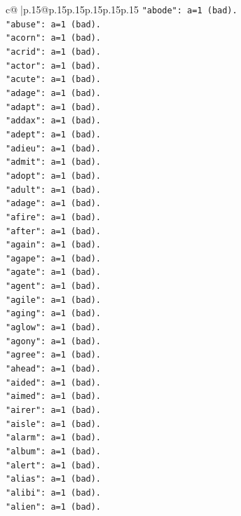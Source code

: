 \documentclass{article}
\begin{document}
{\begin{supertabular}{c@{$\;$}|p{.15\linewidth}@{}p{.15\linewidth}p{.15\linewidth}p{.15\linewidth}p{.15\linewidth}p{.15\linewidth}}
{{{\texttt{"abode": a=1 (bad).} \\
\texttt{"abuse": a=1 (bad).} \\
\texttt{"acorn": a=1 (bad).} \\
\texttt{"acrid": a=1 (bad).} \\
\texttt{"actor": a=1 (bad).} \\
\texttt{"acute": a=1 (bad).} \\
\texttt{"adage": a=1 (bad).} \\
\texttt{"adapt": a=1 (bad).} \\
\texttt{"addax": a=1 (bad).} \\
\texttt{"adept": a=1 (bad).} \\
\texttt{"adieu": a=1 (bad).} \\
\texttt{"admit": a=1 (bad).} \\
\texttt{"adopt": a=1 (bad).} \\
\texttt{"adult": a=1 (bad).} \\
\texttt{"adage": a=1 (bad).} \\
\texttt{"afire": a=1 (bad).} \\
\texttt{"after": a=1 (bad).} \\
\texttt{"again": a=1 (bad).} \\
\texttt{"agape": a=1 (bad).} \\
\texttt{"agate": a=1 (bad).} \\
\texttt{"agent": a=1 (bad).} \\
\texttt{"agile": a=1 (bad).} \\
\texttt{"aging": a=1 (bad).} \\
\texttt{"aglow": a=1 (bad).} \\
\texttt{"agony": a=1 (bad).} \\
\texttt{"agree": a=1 (bad).} \\
\texttt{"ahead": a=1 (bad).} \\
\texttt{"aided": a=1 (bad).} \\
\texttt{"aimed": a=1 (bad).} \\
\texttt{"airer": a=1 (bad).} \\
\texttt{"aisle": a=1 (bad).} \\
\texttt{"alarm": a=1 (bad).} \\
\texttt{"album": a=1 (bad).} \\
\texttt{"alert": a=1 (bad).} \\
\texttt{"alias": a=1 (bad).} \\
\texttt{"alibi": a=1 (bad).} \\
\texttt{"alien": a=1 (bad).} \\
}}}
\end{supertabular}}
\end{document}
